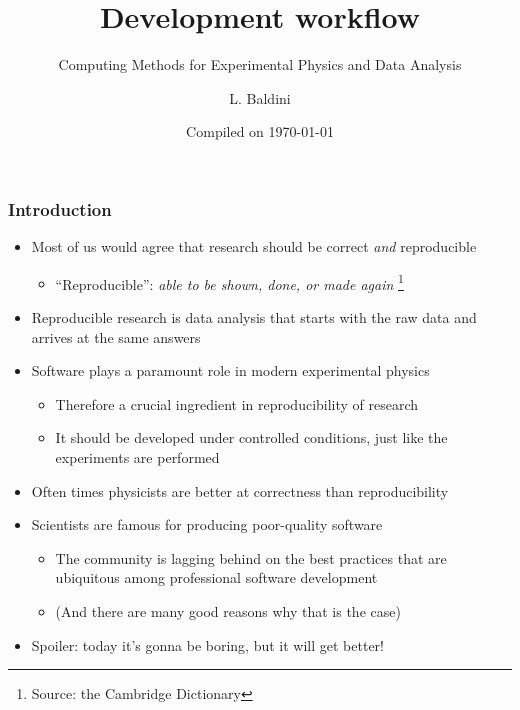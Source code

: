 \documentclass[9pt]{beamer}
\title{Development workflow}
\subtitle{Computing Methods for Experimental Physics and Data Analysis}
\date{Compiled on \today}
\author{L. Baldini}
\institute[UNIPI and INFN]{Universit\`a and INFN--Pisa}
\begin{document}
\titleframe

\begin{frame}
  \frametitle{Introduction}
  \begin{itemize}
  \item Most of us would agree that research should be \alert{correct}
    \emph{and} \alert{reproducible}
    \begin{itemize}
    \item ``Reproducible'': \emph{able to be shown, done, or made again}%
      \footnote{Source: the Cambridge Dictionary}
    \end{itemize}
  \item Reproducible research is data analysis that starts with the raw data
    and arrives at the same answers
  \item Software plays a paramount role in modern experimental physics
    \begin{itemize}
    \item Therefore a crucial ingredient in reproducibility of research
    \item It should be developed under controlled conditions, just like the
      experiments are performed
    \end{itemize}
  \item \alert{Often times physicists are better at correctness than
    reproducibility}
  \item Scientists are famous for producing poor-quality software
    \begin{itemize}
    \item The community is lagging behind on the best practices that are
      ubiquitous among professional software development
    \item (And there are many good reasons why that is the case)
    \end{itemize}
  \item \alert{Spoiler: today it's gonna be boring, but it will get better!}
  \end{itemize}
\end{frame}
\end{document}

